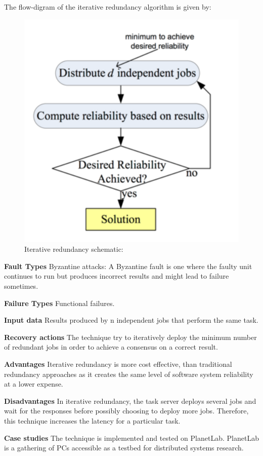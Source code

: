 \begin{compactitem}
The flow-digram of the iterative redundancy algorithm is given by:
\begin{figure}[H]
\center
\includegraphics[width=5in]{img/Iterativeredundancyschematic}
\caption{Iterative redundancy schematic:}
\end{figure} 

\item[\textbf{Fault Types}]Byzantine attacks: A Byzantine fault is one where the faulty unit continues to run but produces incorrect results and might lead to failure sometimes. 

\item[\textbf{Failure Types}]Functional failures.

\item[\textbf{Input data}] Results produced by n independent jobs that perform the same task.

\item[\textbf{Recovery actions}]The technique try to  iteratively deploy the minimum number of redundant jobs in order to achieve a consensus on a correct result.

\item[\textbf{Advantages}] Iterative redundancy is more cost effective, than traditional redundancy approaches as it creates the same level of software system reliability at a lower expense.

\item[\textbf{Disadvantages}] In iterative redundancy, the task server deploys several jobs and wait for the responses before possibly choosing to deploy more jobs. Therefore, this technique increases the latency for a particular task.

\item[\textbf{Case studies}]
The technique is implemented and tested on PlanetLab. PlanetLab is a gathering of PCs accessible as a testbed for distributed systems research.\\
\end{compactitem}


